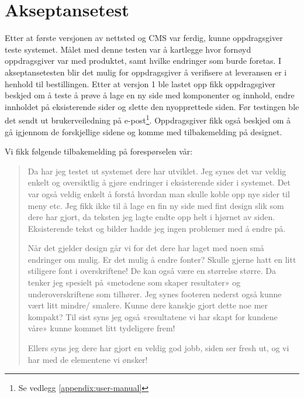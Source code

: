 \section{Akseptansetest}
Etter at første versjonen av nettsted og CMS var ferdig, kunne oppdragsgiver teste systemet. Målet med denne testen var å kartlegge hvor fornøyd oppdragsgiver var med produktet, samt hvilke endringer som burde foretas. I akseptansetesten blir det mulig for oppdragsgiver å verifisere at leveransen er i henhold til bestillingen. 
Etter at versjon 1 ble lastet opp fikk oppdragsgiver beskjed om å teste å prøve å lage en ny side med komponenter og innhold, endre innholdet på eksisterende sider og slette den nyopprettede siden. Før testingen ble det sendt ut brukerveiledning på e-post\footnote{Se vedlegg \ref{appendix:user-manual}}. Oppdragsgiver fikk også beskjed om å gå igjennom de forskjellige sidene og komme med tilbakemelding på designet. 

Vi fikk følgende tilbakemelding på forespørselen vår: 

\begin{quote}
Da har jeg testet ut systemet dere har utviklet. Jeg synes det var veldig enkelt og oversiktlig å gjøre endringer i eksisterende sider i systemet. Det var også veldig enkelt å forstå hvordan man skulle koble opp nye sider til meny etc. Jeg fikk ikke til å lage en fin ny side med fint design slik som dere har gjort, da teksten jeg lagte endte opp helt i hjørnet av siden. Eksisterende tekst og bilder hadde jeg ingen problemer med å endre på.

Når det gjelder design går vi for det dere har laget med noen små endringer om mulig. Er det mulig å endre fonter? Skulle gjerne hatt en litt stiligere font i overskriftene! De kan også være en størrelse større. Da tenker jeg spesielt på «metodene som skaper resultater» og underoverskriftene som tilhører. Jeg synes footeren nederst også kunne vært litt mindre/ smalere. Kunne dere kanskje gjort dette noe mer kompakt? Til sist syns jeg også «resultatene vi har skapt for kundene våre» kunne kommet litt tydeligere frem!

Ellers syns jeg dere har gjort en veldig god jobb, siden ser fresh ut, og vi har med de elementene vi ønsker!
\end{quote}

